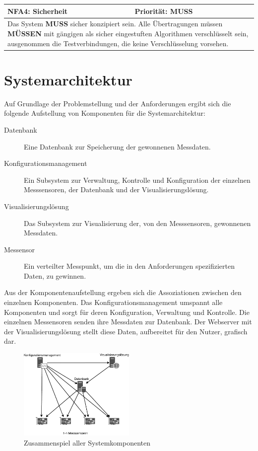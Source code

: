 \documentclass[titlepage]{report}
\begin{document}
\begin{center}
\begin{tabular}{p{}>{\raggedleft\arraybackslash}p{}}\toprule
    \textbf{NFA4: Sicherheit} & \textbf{Priorität: MUSS} \\\midrule
	\multicolumn{2}{p{\textwidth-\tabcolsep}}{%
        Das System \textbf{MUSS} sicher konzipiert sein.
        Alle Übertragungen müssen \textbf{MÜSSEN} mit gängigen
        als sicher eingestuften Algorithmen verschlüsselt sein,
        ausgenommen die Testverbindungen, die keine Verschlüsselung
        vorsehen.
        }\\\bottomrule
\end{tabular}
\end{center}
\section*{Systemarchitektur}
Auf Grundlage der Problemstellung und der Anforderungen ergibt sich die
folgende Aufstellung von Komponenten für die Systemarchitektur:
\begin{description}
    \item[Datenbank] Eine Datenbank zur Speicherung der
                     gewonnenen Messdaten.
    \item[Konfigurationsmanagement] Ein Subsystem zur Verwaltung, Kontrolle
        und Konfiguration der einzelnen Messsensoren, der Datenbank und
        der Visualisierungslösung.
    \item[Visualisierungslösung] Das Subsystem zur Visualisierung der, von
        den Messsensoren, gewonnenen Messdaten.
    \item[Messensor] Ein verteilter Messpunkt, um die in den
        Anforderungen spezifizierten Daten, zu gewinnen.
\end{description}
Aus der Komponentenaufstellung ergeben sich die Assoziationen zwischen
den einzelnen Komponenten. Das Konfigurationsmanagement umspannt alle
Komponenten und sorgt für deren Konfiguration, Verwaltung und Kontrolle.
Die einzelnen Messensoren senden ihre Messdaten zur Datenbank. Der
Webserver mit der Visualisierungslösung stellt diese Daten, aufbereitet
für den Nutzer, grafisch dar.
\begin{figure}[H]
    \centering
    \includegraphics[width=0.5\textwidth]{figures/network.pdf}
    \caption{Zusammenspiel aller Systemkomponenten}\label{fig:5}
\end{figure}
\end{document}

